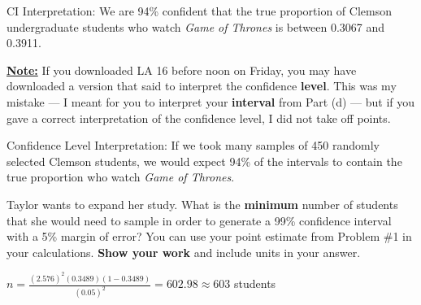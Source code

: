 \documentclass[noanswers]{exam}
\begin{document}
\begin{questions}
\begin{parts}
	\begin{solution}[\stretch{1}]
	
	\vspace{3mm}
	
	CI Interpretation: We are 94\% confident that the true proportion of Clemson undergraduate students who watch \textit{Game of Thrones} is between 0.3067 and 0.3911.
	
	\vspace{3mm}
	
	\underline{\textbf{Note:}} If you downloaded LA 16 before noon on Friday, you may have downloaded a version that said to interpret the confidence \textbf{level}. This was my mistake --- I meant for you to interpret your \textbf{interval} from Part (d) --- but if you gave a correct interpretation of the confidence level, I did not take off points. 
	
	\vspace{3mm}
	
	Confidence Level Interpretation: If we took many samples of 450 randomly selected Clemson students, we would expect 94\% of the intervals to contain the true proportion who watch \textit{Game of Thrones}.
	\end{solution}
	
	\vspace{3mm}
	
	\end{parts}
	
	\question Taylor wants to expand her study. What is the \textbf{minimum} number of students that she would need to sample in order to generate a 99\% confidence interval with a 5\% margin of error? You can use your point estimate from Problem \#1 in your calculations. \textbf{Show your work }and include units in your answer.
	
	\begin{solution}[\stretch{1}]
	
	\vspace{3mm}
	
	$\displaystyle n=\frac{(2.576)^2(0.3489)(1-0.3489)}{(0.05)^2}=602.98\approx 603$ students
	
	\vspace{3mm}
	\end{solution}
	
	
\end{questions}
\end{document}
